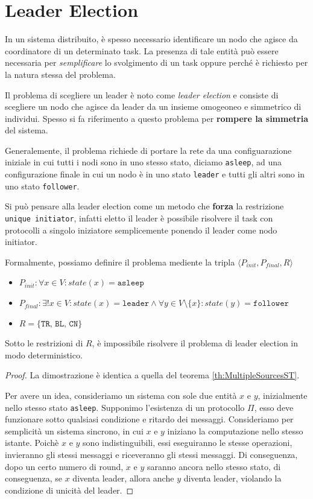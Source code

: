 \chapter{Leader Election}

In un sistema distribuito, è spesso necessario identificare un nodo che agisce da coordinatore di un determinato task. La presenza di tale entità può essere necessaria per \textit{semplificare} lo svolgimento di un task oppure perché è richiesto per la natura stessa del problema. 

Il problema di scegliere un leader è noto come \textit{leader election} e consiste di scegliere un nodo che agisce da leader da un insieme omogeoneo e simmetrico di individui. Spesso si fa riferimento a questo problema per \textbf{rompere la simmetria} del sistema.

Generalemente, il problema richiede di portare la rete da una configuarazione iniziale in cui tutti i nodi sono in uno stesso stato, diciamo \texttt{asleep}, ad una configurazione finale in cui un nodo è in uno stato \texttt{leader} e tutti gli altri sono in uno stato \texttt{follower}. 

Si può pensare alla leader election come un metodo che \textbf{forza} la restrizione \texttt{unique initiator}, infatti eletto il leader è possibile risolvere il task con protocolli a singolo iniziatore semplicemente ponendo il leader come nodo initiator.

Formalmente, possiamo definire il problema mediente la tripla $\langle P_{init}, P_{final}, R \rangle$

\begin{itemize}
    \item $P_{init}: \forall x \in V: state(x) = \texttt{asleep}$ 
    \item $P_{final}: \exists! x \in V: state(x) = \texttt{leader} \land \forall y \in V \setminus \{x\}: state(y) = \texttt{follower}$ 
    \item $R = \{\texttt{TR, BL, CN}\}$
\end{itemize}

\begin{teorema}[Impossibilità]
    Sotto le restrizioni di $R$, è impossibile risolvere il problema di leader election in modo deterministico.
    \begin{proof}
        La dimostrazione è identica a quella del teorema \autoref{th:MultipleSourcesST}.

        Per avere un idea, consideriamo un sistema con sole due entità $x$ e $y$, inizialmente nello stesso stato \texttt{asleep}. Supponimo l'esistenza di un protocollo $\Pi$, esso deve funzionare sotto qualsiasi condizione e ritardo dei messaggi. Consideriamo per semplicità un sistema sincrono, in cui $x$ e $y$ iniziano la computazione nello stesso istante. Poichè $x$ e $y$ sono indistinguibili, essi eseguiranno le stesse operazioni, invieranno gli stessi messaggi e riceveranno gli stessi messaggi. Di conseguenza, dopo un certo numero di round, $x$ e $y$ saranno ancora nello stesso stato, di conseguenza, se $x$ diventa leader, allora anche $y$ diventa leader, violando la condizione di unicità del leader.
    \end{proof}
\end{teorema}

